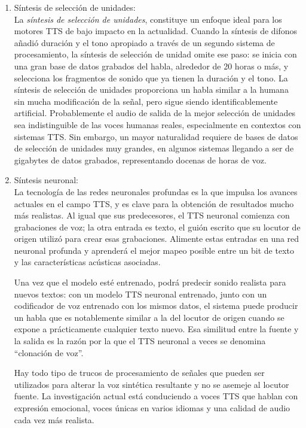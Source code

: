 \begin{enumerate}
	\item Síntesis de selección de unidades: \\ La \textit{síntesis de selección de unidades}, constituye un enfoque ideal para los motores TTS de bajo impacto en la actualidad. Cuando la síntesis de difonos añadió duración y el tono apropiado a través de un segundo sistema de procesamiento, la síntesis de selección de unidad omite ese paso: se inicia con una gran base de datos grabados del habla, alrededor de 20 horas o más, y selecciona los fragmentos de sonido que ya tienen la duración y el tono. La síntesis de selección de unidades proporciona un habla similar a la humana sin mucha modificación de la señal, pero sigue siendo identificablemente artificial. Probablemente el audio de salida de la mejor selección de unidades sea indistinguible de las voces humanas reales, especialmente en contextos con sistemas TTS. Sin embargo, un mayor naturalidad requiere de bases de datos de selección de unidades muy grandes, en algunos sistemas llegando a ser de gigabytes de datos grabados, representando docenas de horas de voz. 
	
	\item Síntesis neuronal: \\ La tecnología de las redes neuronales profundas es la que impulsa los avances actuales en el campo TTS, y es clave para la obtención de resultados mucho más realistas. Al igual que sus predecesores, el TTS neuronal comienza con grabaciones de voz; la otra entrada es texto, el guión escrito que su locutor de origen utilizó para crear esas grabaciones. Alimente estas entradas en una red neuronal profunda y aprenderá el mejor mapeo posible entre un bit de texto y las características acústicas asociadas. 
	
	Una vez que el modelo esté entrenado, podrá predecir sonido realista para nuevos textos: con un modelo TTS neuronal entrenado, junto con un codificador de voz entrenado con los mismos datos, el sistema puede producir un habla que es notablemente similar a la del locutor de origen cuando se expone a prácticamente cualquier texto nuevo. Esa similitud entre la fuente y la salida	es la razón por la que el TTS neuronal a veces se denomina “clonación de voz”.
	
	Hay todo tipo de trucos de procesamiento de señales que pueden ser utilizados para alterar la voz sintética resultante y no se asemeje al locutor fuente. La investigación actual está	conduciendo a voces TTS que hablan con expresión emocional, voces únicas en varios idiomas y una calidad de audio cada vez más realista.
\end{enumerate}


